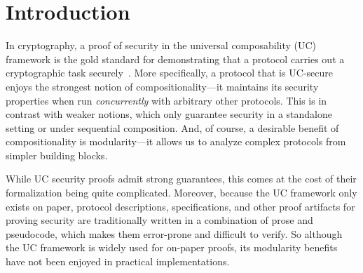 \section{Introduction}
\label{sec:introduction}

In cryptography, a proof of security in the universal composability (UC)
framework is the gold standard for demonstrating that a protocol carries out a
cryptographic task securely~\cite{canetti2001universally}. More specifically, a
protocol that is UC-secure enjoys the strongest notion of compositionality---it
maintains its security properties when run \emph{concurrently} with arbitrary
other protocols. This is in contrast with weaker notions, which only guarantee
security in a standalone setting or under sequential composition. And, of
course, a desirable benefit of compositionality is modularity---it allows us to
analyze complex protocols from simpler building blocks.

\begin{comment}
In a nutshell, security proofs in UC follow the real/ideal
paradigm~\cite{goldreich1987play}. The security requirements of a given task are
defined as a program for a \emph{single trusted process} called an \emph{ideal
  functionality}, which runs in an imagined ideal world. This serves as a
specification of the desired security properties for a distributed protocol
achieving the task across \emph{many unstrusted processes}, which runs in the
real world. Roughly speaking, we say that a protocol $\pi$ \emph{emulates} an
ideal functionality $\mc{F}$ (i.e., it meets its specification) if every
adversarial behavior in the real world can also be exhibited in the ideal world.
\end{comment}

While UC security proofs admit strong guarantees, this comes at the cost of
their formalization being quite complicated. Moreover, because the UC framework
only exists on paper, protocol descriptions, specifications, and other proof
artifacts for proving security are traditionally written in a combination of
prose and pseudocode, which makes them error-prone and difficult to verify. So
although the UC framework is widely used for on-paper proofs, its modularity
benefits have not been enjoyed in practical implementations.

